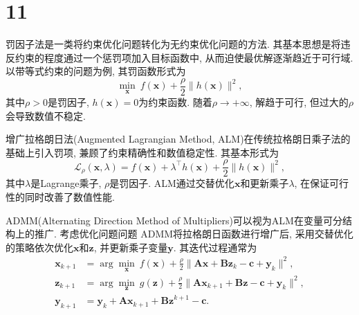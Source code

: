 \section*{11}

罚因子法是一类将约束优化问题转化为无约束优化问题的方法.
其基本思想是将违反约束的程度通过一个惩罚项加入目标函数中, 从而迫使最优解逐渐趋近于可行域.
以带等式约束的问题为例, 其罚函数形式为
\begin{equation*}
    \min_{\bm{x}} ~ f(\bm{x})+\frac{\rho}{2}\|h(\bm{x})\|^2,
\end{equation*}
其中$\rho>0$是罚因子, $h(\bm{x}) = 0$为约束函数.
随着$\rho\to+\infty$, 解趋于可行, 但过大的$\rho$会导致数值不稳定.

增广拉格朗日法(Augmented Lagrangian Method, ALM)在传统拉格朗日乘子法的基础上引入罚项, 兼顾了约束精确性和数值稳定性.
其基本形式为
\begin{equation*}
    \mathcal{L}_\rho(\bm{x}, \lambda)=f(\bm{x})+\lambda^\top h(\bm{x})+\frac{\rho}{2}\|h(\bm{x})\|^2,
\end{equation*}
其中$\lambda$是Lagrange乘子, $\rho$是罚因子.
ALM通过交替优化$\bm{x}$和更新乘子$\lambda$, 在保证可行性的同时改善了数值性能.

ADMM(Alternating Direction Method of Multipliers)可以视为ALM在变量可分结构上的推广.
考虑优化问题问题
ADMM将拉格朗日函数进行增广后, 采用交替优化的策略依次优化$\bm{x}$和$\bm{z}$, 并更新乘子变量$\bm{y}$.
其迭代过程通常为
\begin{align*}
    \bm{x}_{k+1} &= \arg\min_{\bm{x}} ~ f(\bm{x})+\frac{\rho}{2}\|\bm{Ax}+\bm{Bz}_k-\bm{c}+\bm{y}_k\|^2, \\
    \bm{z}_{k+1} &= \arg\min_{\bm{z}} ~ g(\bm{z})+\frac{\rho}{2}\|\bm{Ax}_{k+1}+\bm{Bz}-\bm{c}+\bm{y}_k\|^2, \\
    \bm{y}_{k+1} &= \bm{y}_k+\bm{Ax}_{k+1}+\bm{Bz}^{k+1}-\bm{c}.
\end{align*}
